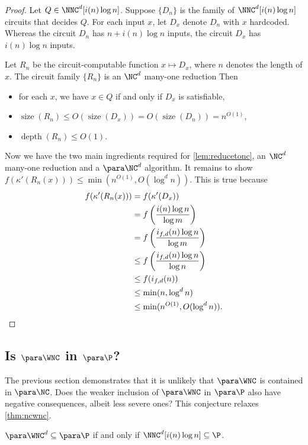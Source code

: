 \documentclass{article}
\DeclareMathOperator{\depth}{depth}
\DeclareMathOperator{\size}{size}
\begin{document}
\begin{proof}
  Let $Q \in \NNC^d[i(n) \log n]$.
  Suppose $\{D_n\}$ is the family of $\NNC^d[i(n) \log n]$ circuits that decides $Q$.
  For each input $x$, let $D_x$ denote $D_n$ with $x$ hardcoded.
  Whereas the circuit $D_n$ has $n + i(n) \log n$ inputs, the circuit $D_x$ has $i(n) \log n$ inputs.

  Let $R_n$ be the circuit-computable function $x \mapsto D_x$, where $n$ denotes the length of $x$.
  The circuit family $\{R_n\}$ is an $\NC^d$ many-one reduction
  Then
  \begin{itemize}
  \item for each $x$, we have $x \in Q$ if and only if $D_x$ is satisfiable,
  \item $\size(R_n) \leq O(\size(D_x)) = O(\size(D_n)) = n^{O(1)}$,
  \item $\depth(R_n) \leq O(1)$.
  \end{itemize}
  Now we have the two main ingredients required for \autoref{lem:reducetonc}, an $\NC^d$ many-one reduction and a $\para \NC^d$ algorithm.
  It remains to show $f(\kappa'(R_n(x))) \leq \min(n^{O(1)}, O(\log^d n))$.
  This is true because
  \begin{align*}
    f(\kappa'(R_n(x))) & = f(\kappa'(D_x)) \\
    & = f\left(\frac{i(n) \log n}{\log m}\right) \\
    & = f\left(\frac{i_{f, d}(n) \log n}{\log m}\right) \\
    & \leq f\left(\frac{i_{f, d}(n) \log n}{\log n}\right) \\
    & \leq f(i_{f, d}(n)) \\
    & \leq \min(n, \log^d n) \\
    & \leq \min(n^{O(1)}, O(\log^d n)). \qedhere
  \end{align*}
\end{proof}

\subsection{Is \texorpdfstring{$\para \WNC$}{paraWNC} in \texorpdfstring{$\para \P$}{paraP}?}
\label{sec:wncp}

The previous section demonstrates that it is unlikely that $\para \WNC$ is contained in $\para \NC$.
Does the weaker inclusion of $\para \WNC$ in $\para \P$ also have negative consequences, albeit less severe ones?
This conjecture relaxes \autoref{thm:ncwnc}.

\begin{conjecture}\label{con:wncp}
  $\para \WNC^d \subseteq \para \P$ if and only if $\NNC^d[i(n) \log n] \subseteq \P$.
\end{conjecture}
\end{document}
